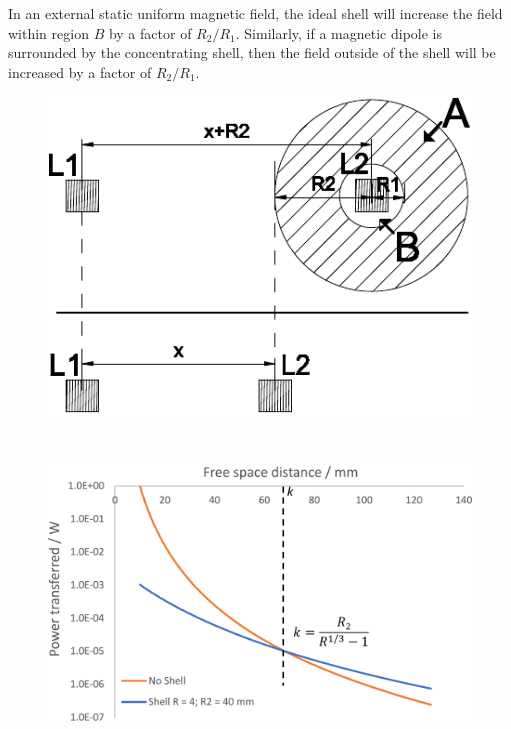 \documentclass[11pt]{iopart}
\begin{document}
In an external static uniform magnetic
field, the ideal shell will increase the field within region $B$ by a
factor of $R_2/R_1$. Similarly, if a magnetic dipole is surrounded by
the concentrating shell, then the field outside of the shell will be
increased by a factor of $R_2/R_1$. 
\begin{figure}
  \begin{center}
    \vspace{-1em}
    \begin{minipage}{0.35\linewidth}
   \noindent\includegraphics[width=\linewidth]{images/free_space.pdf}
    \end{minipage}
   ~
    \begin{minipage}{0.48\linewidth}
    \vspace{1em}\includegraphics[width=\linewidth]{images/dist_motiv.pdf}

\end{minipage}
\end{center}
\end{figure}
\end{document}
